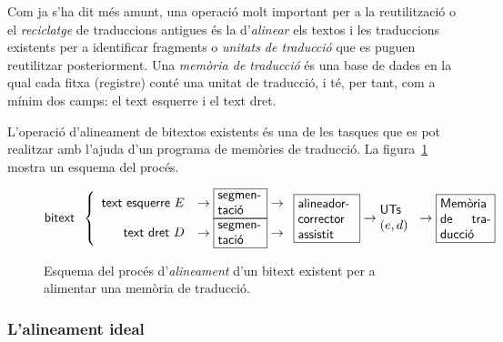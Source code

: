 Com ja s'ha dit més amunt, una operació molt important per a la
reutilització o el \emph{reciclatge} de traduccions antigues és la
d'\emph{alinear} els textos i les traduccions existents per a
identificar fragments o \emph{unitats de traducció} que es puguen
reutilitzar posteriorment.  Una \emph{memòria de traducció} és una
base de dades en la qual cada fitxa (registre) conté una unitat de
traducció, i té, per tant, com a mínim dos camps: el text esquerre i
el text dret.

L'operació d'alineament de bitextos existents és una de les tasques
que es pot realitzar amb l'ajuda d'un programa de memòries de
traducció. La figura~\ref{fg:aliMT} mostra un esquema del procés.
\begin{figure}
$$
\mbox{\textsf{bitext}}\;\;\left\{\begin{array}{rcl}
\mbox{\textsf{text esquerre $E$}} &\to \mbox{\framebox{\parbox{1.25cm}{\textsf{segmen-
      tació}}}} 
\to \\
\mbox{\textsf{text dret $D$}} &\to \mbox{\framebox{\parbox{1.25cm}{\textsf{segmen- tació}}}} 
\to \\
\end{array}
\right.
\mbox{\framebox{\parbox{1.6cm}{\textsf{alineador- corrector assistit}}}}
\to \mbox{\parbox{1cm}{\textsf{UTs} $(e,d)$}} \to \mbox{\framebox{\parbox{1.4cm}{\textsf{Memòria de traducció}}}}
$$
\caption{Esquema del procés d'\emph{alineament} d'un bitext existent per a alimentar
  una memòria de traducció.}
\label{fg:aliMT}
\end{figure}



\subsubsection{L'alineament ideal}


